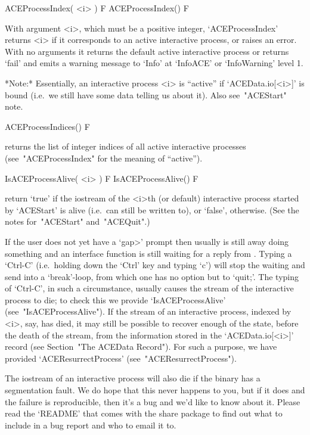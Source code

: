 
\>ACEProcessIndex( <i> ) F
\>ACEProcessIndex() F

With argument <i>, which must be a positive integer, `ACEProcessIndex'
returns <i> if it corresponds to an  active  interactive  process,  or
raises an error. With no  arguments  it  returns  the  default  active
interactive process or returns `fail' and emits a warning  message  to
`Info' at `InfoACE' or `InfoWarning' level 1.

*Note:*
Essentially, an  interactive  {\ACE}  process  <i>  is  ``active''  if
`ACEData.io[<i>]' is bound (i.e.~we still have some  data  telling  us
about it). Also see~"ACEStart" note.

\>ACEProcessIndices() F

returns the list of integer indices of all active  interactive  {\ACE}
processes (see~"ACEProcessIndex" for the meaning of ``active'').

\>IsACEProcessAlive( <i> ) F
\>IsACEProcessAlive() F

return `true' if  the  {\GAP}  iostream  of  the  <i>th  (or  default)
interactive {\ACE} process started by `ACEStart'  is  alive  (i.e.~can
still  be  written  to),  or  `false',  otherwise.  (See   the   notes
for~"ACEStart" and~"ACEQuit".)

If the user does not yet have a `gap>' prompt then usually  {\ACE}  is
still away doing something and an {\ACE} interface function  is  still
waiting for a reply from {\ACE}. Typing a `Ctrl-C' (i.e.~holding  down
the `Ctrl' key and typing `c') will stop the waiting and  send  {\GAP}
into a `break'-loop, from which one has no option but to `quit;'.  The
typing of `Ctrl-C', in such a circumstance, usually causes the  stream
of the interactive {\ACE} process to die; to  check  this  we  provide
`IsACEProcessAlive' (see~"IsACEProcessAlive"). If  the  stream  of  an
interactive {\ACE} process, indexed by <i>,  say,  has  died,  it  may
still be possible to recover enough of the state, before the death  of
the stream, from  the  information  stored  in  the  `ACEData.io[<i>]'
record (see Section~"The ACEData Record"). For such a purpose, we have
provided `ACEResurrectProcess' (see~"ACEResurrectProcess").

The {\GAP} iostream of an interactive {\ACE} process will also die  if
the {\ACE} binary has a segmentation fault. We do hope that this never
happens to you, but if it does and the failure is  reproducible,  then
it's a bug and we'd like to know about it. Please  read  the  `README'
that comes with the {\ACE} share package to find out what  to  include
in a bug report and who to email it to.

